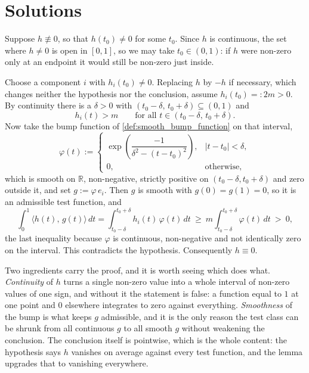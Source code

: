 
\section{Solutions}
\label{sec:geodesics_solutions}

\begin{exercisesolution}
\label{sol:ai_fundamental_lemma}
Suppose $h \not\equiv 0$, so that $h(t_0) \neq 0$ for some $t_0$. Since $h$ is continuous, the
set where $h \neq 0$ is open in $[0,1]$, so we may take $t_0 \in (0,1)$: if $h$ were non-zero
only at an endpoint it would still be non-zero just inside.

Choose a component $i$ with $h_i(t_0) \neq 0$. Replacing $h$ by $-h$ if necessary, which changes
neither the hypothesis nor the conclusion, assume $h_i(t_0) =: 2m > 0$. By continuity there is a
$\delta > 0$ with $(t_0-\delta,\,t_0+\delta) \subseteq (0,1)$ and
\[h_i(t) > m \qquad\text{for all } t \in (t_0-\delta,\,t_0+\delta).\]
Now take the bump function of \cref{def:smooth_bump_function} on that interval,
\[\varphi(t) := \begin{cases}
    \exp\!\left(\dfrac{-1}{\delta^2 - (t-t_0)^2}\right), & \lvert t-t_0\rvert < \delta, \\[2ex]
    0, & \text{otherwise,}
  \end{cases}\]
which is smooth on $\mathbb{R}$, non-negative, strictly positive on $(t_0-\delta,t_0+\delta)$ and
zero outside it, and set $g := \varphi\,e_i$. Then $g$ is smooth with $g(0) = g(1) = 0$, so it is
an admissible test function, and
\[\int_0^1 \big\langle h(t),\,g(t)\big\rangle\,dt
  = \int_{t_0-\delta}^{t_0+\delta} h_i(t)\,\varphi(t)\,dt
  \ \geq\ m\int_{t_0-\delta}^{t_0+\delta}\varphi(t)\,dt \ > \ 0,\]
the last inequality because $\varphi$ is continuous, non-negative and not identically zero on the
interval. This contradicts the hypothesis. Consequently $h \equiv 0$.

\begin{remark}
\label{rem:fundamental_lemma_hypotheses}
Two ingredients carry the proof, and it is worth seeing which does what. \emph{Continuity} of $h$
turns a single non-zero value into a whole interval of non-zero values of one sign, and without
it the statement is false: a function equal to $1$ at one point and $0$ elsewhere integrates to
zero against everything. \emph{Smoothness} of the bump is what keeps $g$ admissible, and it is
the only reason the test class can be shrunk from all continuous $g$ to all smooth $g$ without
weakening the conclusion. The conclusion itself is pointwise, which is the whole content: the
hypothesis says $h$ vanishes on average against every test function, and the lemma upgrades that
to vanishing everywhere.
\end{remark}
\end{exercisesolution}

